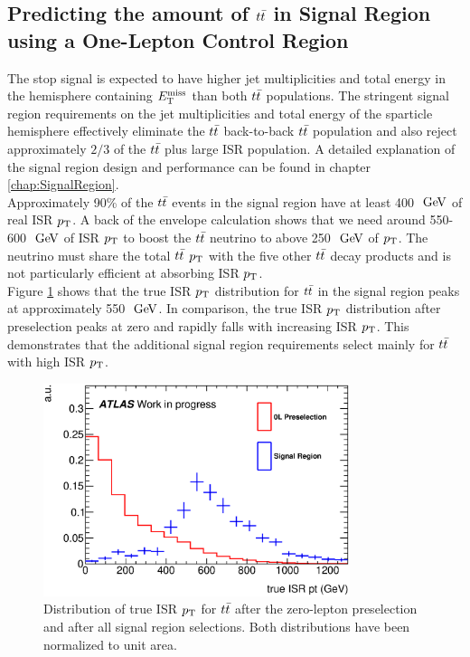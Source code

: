 \subsection{Predicting the amount of $\ttbar$ in Signal Region using a One-Lepton Control Region}
\label{sec:Bkg:ttbar:CR}

\indent The stop signal is expected to have higher jet multiplicities and total energy in the hemisphere containing $E_{\mathrm{T}}^{\mathrm{miss}}$ than both $\ttbar$ populations.  The stringent signal region requirements on the jet multiplicities and total energy of the sparticle hemisphere effectively eliminate the $\ttbar$ back-to-back $\ttbar$ population and also reject approximately $2/3$ of the $\ttbar$ plus large ISR population.  A detailed explanation of the signal region design and performance can be found in chapter \ref{chap:SignalRegion}. \\

\indent Approximately 90\% of the $\ttbar$ events in the signal region have at least 400 $\gev$ of real ISR $\pt$.  A back of the envelope calculation shows that we need around 550-600 $\gev$ of ISR $\pt$ to boost the $\ttbar$ neutrino to above 250 $\gev$ of $\pt$.  The neutrino must share the total $\ttbar$ $\pt$ with the five other $\ttbar$ decay products and is not particularly efficient at absorbing ISR $\pt$.  \\

\indent Figure \ref{fig:ttbar:SR:trueISRpt_presel_SRC1} shows that the true ISR $\pt$ distribution for $\ttbar$ in the signal region peaks at approximately 550 $\gev$.  In comparison, the true ISR $\pt$ distribution after preselection peaks at zero and rapidly falls with increasing ISR $\pt$.  This demonstrates that the additional signal region requirements select mainly for $\ttbar$ with high ISR $\pt$.  \\

\begin{figure}[h!]
  \centering
	\includegraphics[width=0.80\textwidth]{./figures/strategy/Compare0L_truth.eps}
\caption[Distribution of true ISR $\pt$ for $\ttbar$after the zero-lepton preselection and after all signal region selections]{Distribution of true ISR $\pt$ for $\ttbar$ after the zero-lepton preselection and after all signal region selections.  Both distributions have been normalized to unit area.}
\label{fig:ttbar:SR:trueISRpt_presel_SRC1}
\end{figure}

